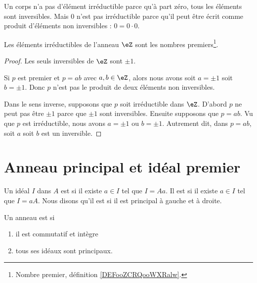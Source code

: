 \begin{example}
	Un corps n'a pas d'élément irréductible parce qu'à part zéro, tous les éléments sont inversibles. Mais \( 0\) n'est pas irréductible parce qu'il peut être écrit comme produit d'éléments non inversibles : \( 0=0\cdot 0\).
\end{example}

\begin{proposition}     \label{PROPooKDWQooTtScrN}
	Les éléments irréductibles de l'anneau \( \eZ\) sont les nombres premiers\footnote{Nombre premier, définition \ref{DEFooZCRQooWXRalw}.}.
\end{proposition}

\begin{proof}
	Les seuls inversibles de \( \eZ\) sont \( \pm 1\).

	Si \( p\) est premier et \( p=ab\) avec \( a,b\in \eZ\), alors nous avons soit \( a=\pm 1\) soit \( b=\pm 1\). Donc \( p\) n'est pas le produit de deux éléments non inversibles.

	Dans le sens inverse, supposons que \( p\) soit irréductible dans \( \eZ\). D'abord \( p\) ne peut pas être \( \pm 1\) parce que \( \pm 1\) sont inversibles. Ensuite supposons que \( p=ab\). Vu que \( p\) est irréductible, nous avons \( a=\pm1\) ou \( b=\pm1\). Autrement dit, dans \( p=ab\), soit \( a\) soit \( b\) est un inversible.
\end{proof}




\section{Anneau principal et idéal premier}

\begin{definition}      \label{DEFooMZRKooBPLAWH}
	Un idéal \( I\) dans \( A\) est  si il existe \( a\in I\) tel que \( I= A a\). Il est  si il existe \( a\in I\) tel que \( I=a A\). Nous disons qu'il est  si il est principal à gauche et à droite.
\end{definition}

\begin{definition}          \label{DEFooGWOZooXzUlhK}
	Un anneau est  si
	\begin{enumerate}
		\item
		      il est commutatif et intègre
		\item
		      tous ses idéaux sont principaux.
	\end{enumerate}
\end{definition}

